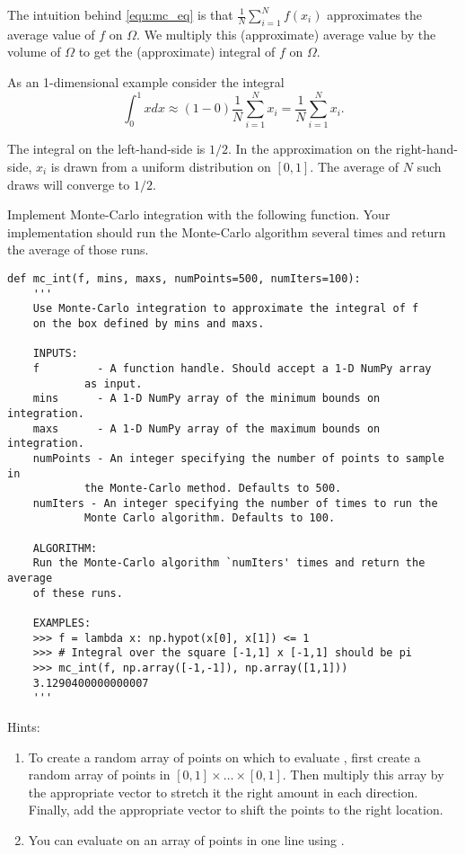 The intuition behind \eqref{equ:mc_eq} is that $\frac{1}{N} \sum_{i=1}^N f(x_i)$ approximates the average value of $f$ on $\Omega$.
We multiply this (approximate) average value by the volume of $\Omega$ to get the (approximate) integral of $f$ on $\Omega$.

As an 1-dimensional example consider the integral 
\[
\int_0^1 x dx \approx (1-0)\frac{1}{N} \sum_{i=1}^N x_i=\frac{1}{N} \sum_{i=1}^N x_i.
\]

The integral on the left-hand-side is $1/2$. 
In the approximation on the right-hand-side, $x_i$ is drawn from a uniform distribution on $[0,1]$. 
The average of $N$ such draws will converge to $1/2$. 

\begin{problem}
\label{prob:mc}
Implement Monte-Carlo integration with the following function.
Your implementation should run the Monte-Carlo algorithm several times and return the average of those runs.
\begin{lstlisting}
def mc_int(f, mins, maxs, numPoints=500, numIters=100):
    '''
    Use Monte-Carlo integration to approximate the integral of f
    on the box defined by mins and maxs.
    
    INPUTS:
    f         - A function handle. Should accept a 1-D NumPy array 
    	 	as input.
    mins      - A 1-D NumPy array of the minimum bounds on integration.
    maxs      - A 1-D NumPy array of the maximum bounds on integration.
    numPoints - An integer specifying the number of points to sample in 
    		the Monte-Carlo method. Defaults to 500.
    numIters - An integer specifying the number of times to run the 
    		Monte Carlo algorithm. Defaults to 100.
		
    ALGORITHM:
    Run the Monte-Carlo algorithm `numIters' times and return the average
    of these runs.
                
    EXAMPLES:
    >>> f = lambda x: np.hypot(x[0], x[1]) <= 1
    >>> # Integral over the square [-1,1] x [-1,1] should be pi
    >>> mc_int(f, np.array([-1,-1]), np.array([1,1]))
    3.1290400000000007
    '''
\end{lstlisting}

Hints:
\begin{enumerate}
\item To create a random array of points on which to evaluate , first create a random array of points in $[0,1] \times \ldots \times [0,1]$.
Then multiply this array by the appropriate vector to stretch it the right amount in each direction.
Finally, add the appropriate vector to shift the points to the right location.
\item You can evaluate  on an array of points in one line using .
\end{enumerate}
\end{problem}

